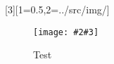 [3][1=0.5,2=../src/img/]{
  \begin{figure} [H]
    \centering
    \texttt{[image: \#2\#3]}
    \caption{Test}
  \end{figure}
}

